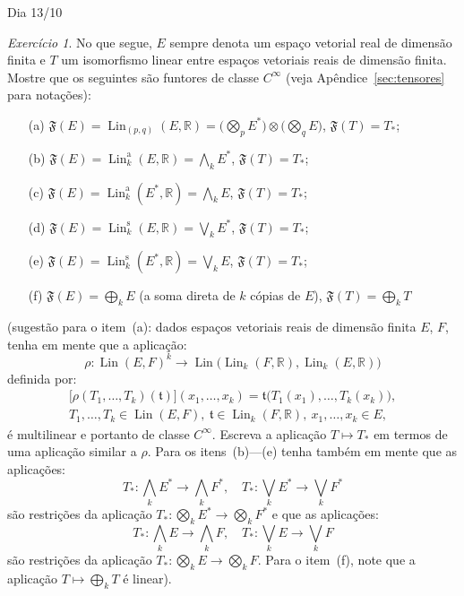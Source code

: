 \documentclass[oneside,11pt]{amsart}
\newcommand{\R}{\mathds R}
\DeclareMathOperator{\Lin}{Lin}
\theoremstyle{remark}\newtheorem{exercise}{Exercício}[section]
\theoremstyle{plain}\newtheorem{teo}{Teorema}[section]
\theoremstyle{plain}\newtheorem{lem}[teo]{Lema}
\theoremstyle{plain}\newtheorem{prop}[teo]{Proposição}
\theoremstyle{definition}\newtheorem{defin}[teo]{Definição}
\theoremstyle{remark}\newtheorem{rem}[teo]{Observação}
\theoremstyle{definition}\newtheorem{example}[teo]{Exemplo}
\numberwithin{equation}{section}
\begin{document}
\begin{section}{Dia 13/10}
\begin{exercise}\label{exe:exemplosfuntor}
No que segue, $E$ sempre denota um espaço vetorial real de dimensão finita e $T$ um isomorfismo linear entre espaços vetoriais reais de dimensão finita.
Mostre que os seguintes são funtores de classe $C^\infty$ (veja Apêndice~\ref{sec:tensores} para notações):
\begin{itemize}
\item[(a)] $\mathfrak F(E)=\Lin_{(p,q)}(E,\R)=\big(\bigotimes_pE^*\big)\otimes\big(\bigotimes_qE\big)$, $\mathfrak F(T)=T_*$;
\smallskip
\item[(b)] $\mathfrak F(E)=\Lin_k^{\mathrm a}(E,\R)=\bigwedge_kE^*$, $\mathfrak F(T)=T_*$;
\smallskip
\item[(c)] $\mathfrak F(E)=\Lin_k^{\mathrm a}(E^*,\R)=\bigwedge_kE$, $\mathfrak F(T)=T_*$;
\smallskip
\item[(d)] $\mathfrak F(E)=\Lin_k^{\mathrm s}(E,\R)=\bigvee_kE^*$, $\mathfrak F(T)=T_*$;
\smallskip
\item[(e)] $\mathfrak F(E)=\Lin_k^{\mathrm s}(E^*,\R)=\bigvee_kE$, $\mathfrak F(T)=T_*$;
\smallskip
\item[(f)] $\mathfrak F(E)=\bigoplus_kE$ (a soma direta de $k$ cópias de $E$), $\mathfrak F(T)=\bigoplus_kT$
\end{itemize}
(sugestão para o item~(a): dados espaços vetoriais reais de dimensão finita $E$, $F$, tenha em mente que a aplicação:
\[\rho:\Lin(E,F)^k\longrightarrow\Lin\!\big(\!\Lin_k(F,\R),\Lin_k(E,\R)\big)\]
definida por:
\begin{multline*}
\big[\rho(T_1,\ldots,T_k)(\mathfrak t)\big](x_1,\ldots,x_k)=\mathfrak t\big(T_1(x_1),\ldots,T_k(x_k)\big),\\
T_1,\ldots,T_k\in\Lin(E,F),\ \mathfrak t\in\Lin_k(F,\R),\ x_1,\ldots,x_k\in E,
\end{multline*}
é multilinear e portanto de classe $C^\infty$. Escreva a aplicação $T\mapsto T_*$ em termos de uma aplicação similar a $\rho$. Para os itens~(b)---(e)
tenha também em mente que as aplicações:
\[T_*:\bigwedge_kE^*\longrightarrow\bigwedge_kF^*,\quad T_*:\bigvee_kE^*\longrightarrow\bigvee_kF^*\]
são restrições da aplicação $T_*:\bigotimes_kE^*\to\bigotimes_kF^*$ e que as aplicações:
\[T_*:\bigwedge_kE\longrightarrow\bigwedge_kF,\quad T_*:\bigvee_kE\longrightarrow\bigvee_kF\]
são restrições da aplicação $T_*:\bigotimes_kE\to\bigotimes_kF$. Para o item~(f), note que a aplicação $T\mapsto\bigoplus_kT$ é linear).
\end{exercise}


\end{section}
\end{document}
